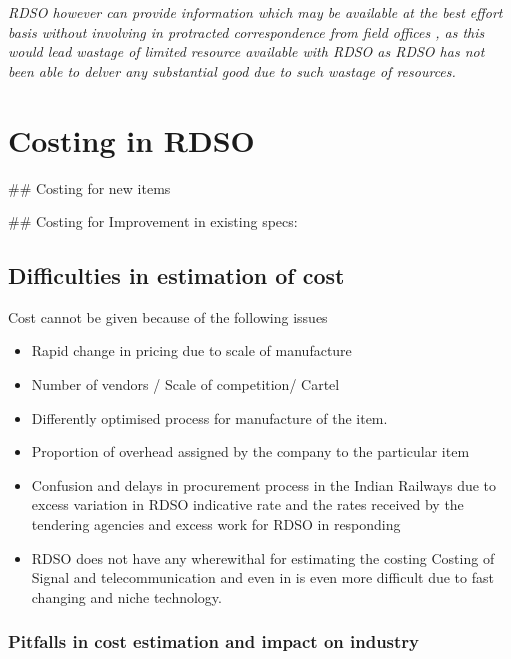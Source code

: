 \documentclass[
  11pt,
  twoside]{article}
\providecommand{\tightlist}{%
  \setlength{\itemsep}{0pt}\setlength{\parskip}{0pt}}
\begin{document}
\emph{RDSO however can provide information which may be available at the best effort basis without involving in protracted correspondence from field offices , as this would lead wastage of limited resource available with RDSO as RDSO has not been able to delver any substantial good due to such wastage of resources.}

\hypertarget{costing-in-rdso}{%
\section{Costing in RDSO}\label{costing-in-rdso}}

\#\# Costing for new items

\#\# Costing for Improvement in existing specs:

\hypertarget{difficulties-in-estimation-of-cost}{%
\subsection{Difficulties in estimation of cost}\label{difficulties-in-estimation-of-cost}}

Cost cannot be given because of the following issues

\begin{itemize}
\tightlist
\item
  Rapid change in pricing due to scale of manufacture
\item
  Number of vendors / Scale of competition/ Cartel
\item
  Differently optimised process for manufacture of the item.
\item
  Proportion of overhead assigned by the company to the particular item
\item
  Confusion and delays in procurement process in the Indian Railways due to excess variation in RDSO indicative rate and the rates received by the tendering agencies and excess work for RDSO in responding
\item
  RDSO does not have any wherewithal for estimating the costing
  Costing of Signal and telecommunication and even in is even more difficult due to fast changing and niche technology.
\end{itemize}

\hypertarget{pitfalls-in-cost-estimation-and-impact-on-industry}{%
\subsubsection{Pitfalls in cost estimation and impact on industry}\label{pitfalls-in-cost-estimation-and-impact-on-industry}}
\end{document}
